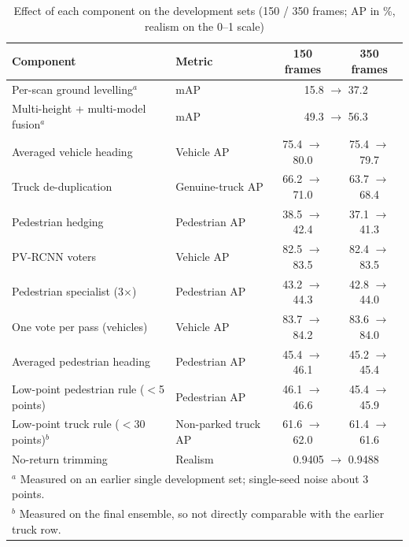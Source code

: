 \documentclass[conference]{IEEEtran}
\begin{document}
\begin{table}[!t]
\caption{Effect of each component on the development sets (150 / 350 frames; AP in \%, realism on the 0--1 scale)}
\label{tab:ablation}
\centering
\small
\begin{tabular}{llcc}
\toprule
Component & Metric & 150 frames & 350 frames \\
\midrule
Per-scan ground levelling$^{a}$             & mAP              & \multicolumn{2}{c}{15.8 $\rightarrow$ 37.2} \\
Multi-height + multi-model fusion$^{a}$     & mAP              & \multicolumn{2}{c}{49.3 $\rightarrow$ 56.3} \\
Averaged vehicle heading                    & Vehicle AP       & 75.4 $\rightarrow$ 80.0 & 75.4 $\rightarrow$ 79.7 \\
Truck de-duplication                        & Genuine-truck AP & 66.2 $\rightarrow$ 71.0 & 63.7 $\rightarrow$ 68.4 \\
Pedestrian hedging                          & Pedestrian AP    & 38.5 $\rightarrow$ 42.4 & 37.1 $\rightarrow$ 41.3 \\
PV-RCNN voters                              & Vehicle AP       & 82.5 $\rightarrow$ 83.5 & 82.4 $\rightarrow$ 83.5 \\
Pedestrian specialist (3$\times$)           & Pedestrian AP    & 43.2 $\rightarrow$ 44.3 & 42.8 $\rightarrow$ 44.0 \\
One vote per pass (vehicles)                & Vehicle AP       & 83.7 $\rightarrow$ 84.2 & 83.6 $\rightarrow$ 84.0 \\
Averaged pedestrian heading                 & Pedestrian AP    & 45.4 $\rightarrow$ 46.1 & 45.2 $\rightarrow$ 45.4 \\
Low-point pedestrian rule ($<$5 points)     & Pedestrian AP    & 46.1 $\rightarrow$ 46.6 & 45.4 $\rightarrow$ 45.9 \\
Low-point truck rule ($<$30 points)$^{b}$   & Non-parked truck AP & 61.6 $\rightarrow$ 62.0 & 61.4 $\rightarrow$ 61.6 \\
No-return trimming                          & Realism          & \multicolumn{2}{c}{0.9405 $\rightarrow$ 0.9488} \\
\bottomrule
\multicolumn{4}{l}{\footnotesize $^{a}$ Measured on an earlier single development set; single-seed noise about 3 points.} \\
\multicolumn{4}{l}{\footnotesize $^{b}$ Measured on the final ensemble, so not directly comparable with the earlier truck row.}
\end{tabular}
\end{table}
\end{document}
